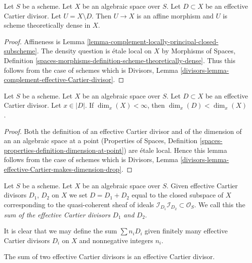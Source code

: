 \begin{lemma}
\label{lemma-complement-effective-Cartier-divisor}
Let $S$ be a scheme. Let $X$ be an algebraic space over $S$.
Let $D \subset X$ be an effective Cartier divisor.
Let $U = X \setminus D$. Then $U \to X$ is an affine morphism and $U$
is scheme theoretically dense in $X$.
\end{lemma}

\begin{proof}
Affineness is Lemma \ref{lemma-complement-locally-principal-closed-subscheme}.
The density question is \'etale local on $X$ by
Morphisms of Spaces, Definition
\ref{spaces-morphisms-definition-scheme-theoretically-dense}.
Thus this follows from the case of schemes which is
Divisors, Lemma
\ref{divisors-lemma-complement-effective-Cartier-divisor}.
\end{proof}

\begin{lemma}
\label{lemma-effective-Cartier-makes-dimension-drop}
Let $S$ be a scheme. Let $X$ be an algebraic space over $S$.
Let $D \subset X$ be an effective Cartier divisor.
Let $x \in |D|$.
If $\dim_x(X) < \infty$, then $\dim_x(D) < \dim_x(X)$.
\end{lemma}

\begin{proof}
Both the definition of an effective Cartier divisor and of the
dimension of an an algebraic space at a point
(Properties of Spaces, Definition
\ref{spaces-properties-definition-dimension-at-point})
are \'etale local. Hence this lemma follows from the case of schemes
which is
Divisors, Lemma \ref{divisors-lemma-effective-Cartier-makes-dimension-drop}.
\end{proof}

\begin{definition}
\label{definition-sum-effective-Cartier-divisors}
Let $S$ be a scheme. Let $X$ be an algebraic space over $S$.
Given effective Cartier divisors
$D_1$, $D_2$ on $X$ we set $D = D_1 + D_2$ equal to the
closed subspace of $X$ corresponding to the quasi-coherent
sheaf of ideals
$\mathcal{I}_{D_1}\mathcal{I}_{D_2} \subset \mathcal{O}_S$.
We call this the {\it sum of the effective Cartier divisors
$D_1$ and $D_2$}.
\end{definition}

\noindent
It is clear that we may define the sum $\sum n_iD_i$ given
finitely many effective Cartier divisors $D_i$ on $X$
and nonnegative integers $n_i$.

\begin{lemma}
\label{lemma-sum-effective-Cartier-divisors}
The sum of two effective Cartier divisors is an effective
Cartier divisor.
\end{lemma}

